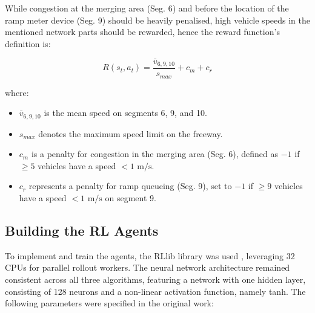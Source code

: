 While congestion at the merging area (Seg. 6) and before the location of the ramp meter device (Seg. 9) should be heavily penalised, high vehicle speeds
in the mentioned network parts should be rewarded, hence the reward function's definition is:

\begin{equation}
    R(s_t, a_t) = \frac{\bar{v}_{6,9,10}}{s_{max}} + c_m + c_r
\end{equation}

where:
\begin{itemize}
    \item $\bar{v}_{6,9,10}$ is the mean speed on segments 6, 9, and 10.
    \item $s_{max}$ denotes the maximum speed limit on the freeway.
    \item $c_m$ is a penalty for congestion in the merging area (Seg. 6), defined as $-1$ if $\ge 5$ vehicles have a speed $< 1 \text{ m/s}$.
    \item $c_r$ represents a penalty for ramp queueing (Seg. 9), set to $-1$ if $\ge 9$ vehicles have a speed $< 1 \text{ m/s}$ on segment 9.
\end{itemize}



\subsection{Building the RL Agents}

To implement and train the agents, the RLlib library was used \cite{liang2018rllib}, leveraging 32 CPUs for parallel rollout workers. 
The neural network architecture remained consistent across all three algorithms, featuring a network with one hidden layer, consisting of 128 neurons and a non-linear activation function, namely tanh. 
The following parameters were specified in the original work:  


